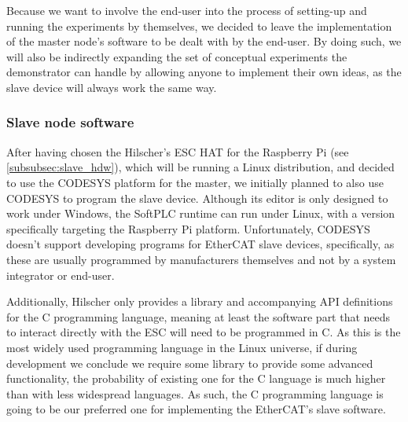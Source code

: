 Because we want to involve the end-user into the process of setting-up and running the experiments by themselves, we decided to leave the implementation of the master node's software to be dealt with by the end-user.
By doing such, we will also be indirectly expanding the set of conceptual experiments the demonstrator can handle by allowing anyone to implement their own ideas, as the slave device will always work the same way.

\subsubsection{Slave node software}

After having chosen the Hilscher's ESC HAT for the Raspberry Pi (see \ref{subsubsec:slave_hdw}), which will be running a Linux distribution, and decided to use the CODESYS platform for the master, we initially planned to also use CODESYS to program the slave device.
Although its editor is only designed to work under Windows, the SoftPLC runtime can run under Linux, with a version specifically targeting the Raspberry Pi platform.
Unfortunately, CODESYS doesn't support developing programs for EtherCAT slave devices, specifically, as these are usually programmed by manufacturers themselves and not by a system integrator or end-user.

Additionally, Hilscher only provides a library and accompanying API definitions for the C programming language, meaning at least the software part that needs to interact directly with the ESC will need to be programmed in C.
As this is the most widely used programming language in the Linux universe, if during development we conclude we require some library to provide some advanced functionality, the probability of existing one for the C language is much higher than with less widespread languages.
As such, the C programming language is going to be our preferred one for implementing the EtherCAT's slave software.


